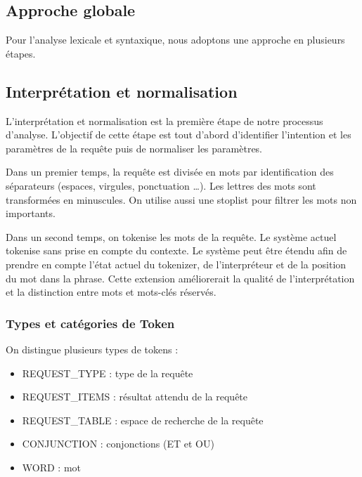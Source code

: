 \documentclass[a4paper]{elsarticle}
\begin{document}
\subsection{Approche globale}

Pour l'analyse lexicale et syntaxique, nous adoptons une approche en plusieurs étapes.

\begin{center}
\end{center}

\subsection{Interprétation et normalisation}

L'interprétation et normalisation est la première étape de notre processus d'analyse. L'objectif de cette étape est tout d'abord d'identifier l'intention et les paramètres de la requête puis de normaliser les paramètres.

Dans un premier temps, la requête est divisée en mots par identification des séparateurs (espaces, virgules, ponctuation \ldots). Les lettres des mots sont transformées en minuscules. On utilise aussi une stoplist pour filtrer les mots non importants.

Dans un second temps, on tokenise les mots de la requête. Le système actuel tokenise sans prise en compte du contexte. Le système peut être étendu afin de prendre en compte l'état actuel du tokenizer, de l'interpréteur et de la position du mot dans la phrase. Cette extension améliorerait la qualité de l'interprétation et la distinction entre mots et mots-clés réservés.

\subsubsection{Types et catégories de Token}

On distingue plusieurs types de tokens :
\begin{itemize}
\item REQUEST\_TYPE : type de la requête
\item REQUEST\_ITEMS : résultat attendu de la requête
\item REQUEST\_TABLE : espace de recherche de la requête
\item CONJUNCTION : conjonctions (ET et OU)
\item WORD : mot
\end{itemize}
\end{document}
